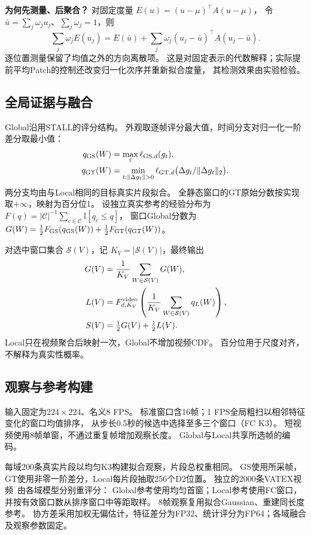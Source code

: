 \textbf{为何先测量、后聚合？}
对固定度量 $E(u)=(u-\mu)^\top A(u-\mu)$，
令 $\bar u=\sum_j\omega_j u_j$、$\sum_j\omega_j=1$，则
\begin{equation}
 \sum_j\omega_j E(u_j)
 =E(\bar u)+\sum_j\omega_j(u_j-\bar u)^\top A(u_j-\bar u).
 \label{eq:dispersion}
\end{equation}
逐位置测量保留了均值之外的方向离散项。
这是对固定表示的代数解释；实际提前平均Patch的控制还改变归一化次序并重新拟合度量，
其检测效果由实验检验。

\subsection{全局证据与融合}
Global沿用STALL的评分结构。
外观取逐帧评分最大值，时间分支对归一化一阶差分取最小值：
\begin{equation}
 \begin{aligned}
 q_{\rm GS}(W)&=\max_t\ell_{{\rm GS},d}(g_t),\\
 q_{\rm GT}(W)&=\min_{t:\|\Delta g_t\|>0}
       \ell_{{\rm GT},d}\bigl(\Delta g_t/\|\Delta g_t\|_2\bigr).
 \end{aligned}
 \label{eq:global_score}
\end{equation}
两分支均由与Local相同的目标真实片段拟合。
全静态窗口的GT原始分数按实现取$+\infty$，映射为百分位1。
设独立真实参考的经验分布为
$F(q)=|\mathcal C|^{-1}\sum_{c\in\mathcal C}\mathbb I[q_c\le q]$，
窗口Global分数为
$G(W)=\tfrac12F_{\rm GS}(q_{\rm GS}(W))+\tfrac12F_{\rm GT}(q_{\rm GT}(W))$。

对选中窗口集合 $\mathcal S(V)$，记 $K_V=|\mathcal S(V)|$，最终输出
\begin{equation}
 \begin{aligned}
 G(V)&=\frac1{K_V}\sum_{W\in\mathcal S(V)}G(W),\\
 L(V)&=F_{d,K_V}^{\rm video}\left(\frac1{K_V}\sum_{W\in\mathcal S(V)}q_L(W)\right),\\
 S(V)&=\tfrac12G(V)+\tfrac12L(V).
 \end{aligned}
 \label{eq:fusion}
\end{equation}
Local只在视频聚合后映射一次，Global不增加视频CDF。
百分位用于尺度对齐，不解释为真实性概率。

\subsection{观察与参考构建}
输入固定为$224\times224$、名义8 FPS。
标准窗口含16帧；1 FPS全局粗扫以相邻特征变化的窗口均值排序，
从步长0.5秒的候选中选择至多三个窗口（FC K3）。
短视频使用8帧单窗，不通过重复帧增加观察长度。
Global与Local共享所选帧的编码。

每域200条真实片段以均匀K3构建拟合观察，片段总权重相同。
GS使用所采帧，GT使用非零一阶差分，Local每片段抽取256个D2位置。
独立的2000条VATEX视频~\cite{wang2019vatex}由各域模型分别重评分：
Global参考使用均匀首窗；Local参考使用FC窗口，并按有效窗口数从排序窗口中等距取样。
8帧观察复用拟合Gaussian、重建同长度参考。
协方差采用加权无偏估计，特征差分为FP32、统计评分为FP64；各域融合及观察参数固定。
